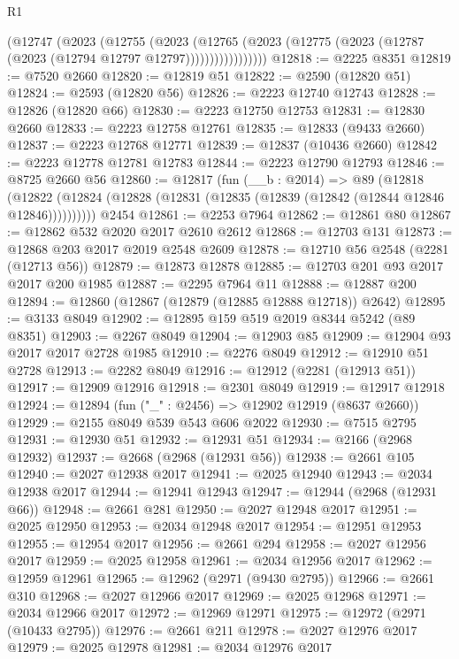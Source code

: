 \begin{lexlean}{R1}
\begin{coremodule}
                (@12747
                  (@2023
                    (@12755
                      (@2023
                        (@12765
                          (@2023
                            (@12775 (@2023 (@12787 (@2023 (@12794 @12797 @12797)))))))))))))))))
@12818 := @2225 @8351
@12819 := @7520 @2660
@12820 := @12819 @51
@12822 := @2590 (@12820 @51)
@12824 := @2593 (@12820 @56)
@12826 := @2223 @12740 @12743
@12828 := @12826 (@12820 @66)
@12830 := @2223 @12750 @12753
@12831 := @12830 @2660
@12833 := @2223 @12758 @12761
@12835 := @12833 (@9433 @2660)
@12837 := @2223 @12768 @12771
@12839 := @12837 (@10436 @2660)
@12842 := @2223 @12778 @12781 @12783
@12844 := @2223 @12790 @12793
@12846 := @8725 @2660 @56
@12860 := @12817
    (fun (__b : @2014) =>
    @89
      (@12818
        (@12822 (@12824 (@12828 (@12831 (@12835 (@12839 (@12842 (@12844 @12846 @12846))))))))))
    @2454
@12861 := @2253 @7964
@12862 := @12861 @80
@12867 := @12862 @532 @2020 @2017 @2610 @2612
@12868 := @12703 @131
@12873 := @12868 @203 @2017 @2019 @2548 @2609
@12878 := @12710 @56 @2548 (@2281 (@12713 @56))
@12879 := @12873 @12878
@12885 := @12703 @201 @93 @2017 @2017 @200 @1985
@12887 := @2295 @7964 @11
@12888 := @12887 @200
@12894 := @12860 (@12867 (@12879 (@12885 @12888 @12718)) @2642)
@12895 := @3133 @8049
@12902 := @12895 @159 @519 @2019 @8344 @5242 (@89 @8351)
@12903 := @2267 @8049
@12904 := @12903 @85
@12909 := @12904 @93 @2017 @2017 @2728 @1985
@12910 := @2276 @8049
@12912 := @12910 @51 @2728
@12913 := @2282 @8049
@12916 := @12912 (@2281 (@12913 @51))
@12917 := @12909 @12916
@12918 := @2301 @8049
@12919 := @12917 @12918
@12924 := @12894 (fun ("_" : @2456) => @12902 @12919 (@8637 @2660))
@12929 := @2155 @8049 @539 @543 @606 @2022
@12930 := @7515 @2795
@12931 := @12930 @51
@12932 := @12931 @51
@12934 := @2166 (@2968 @12932)
@12937 := @2668 (@2968 (@12931 @56))
@12938 := @2661 @105
@12940 := @2027 @12938 @2017
@12941 := @2025 @12940
@12943 := @2034 @12938 @2017
@12944 := @12941 @12943
@12947 := @12944 (@2968 (@12931 @66))
@12948 := @2661 @281
@12950 := @2027 @12948 @2017
@12951 := @2025 @12950
@12953 := @2034 @12948 @2017
@12954 := @12951 @12953
@12955 := @12954 @2017
@12956 := @2661 @294
@12958 := @2027 @12956 @2017
@12959 := @2025 @12958
@12961 := @2034 @12956 @2017
@12962 := @12959 @12961
@12965 := @12962 (@2971 (@9430 @2795))
@12966 := @2661 @310
@12968 := @2027 @12966 @2017
@12969 := @2025 @12968
@12971 := @2034 @12966 @2017
@12972 := @12969 @12971
@12975 := @12972 (@2971 (@10433 @2795))
@12976 := @2661 @211
@12978 := @2027 @12976 @2017
@12979 := @2025 @12978
@12981 := @2034 @12976 @2017

\end{coremodule}
\end{lexlean}
